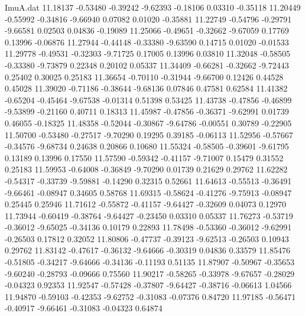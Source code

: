 \begin{filecontents}{ImuA.dat}
  11.18137   -0.53480   -0.39242   -9.62393   -0.18106    0.03310   -0.35118
  11.20449   -0.55992   -0.34816   -9.66940    0.07082    0.01020   -0.35881
  11.22749   -0.54796   -0.29791   -9.66581    0.02503    0.04836   -0.19089
  11.25066   -0.49651   -0.32662   -9.67059    0.17769    0.13996   -0.06876
  11.27944   -0.44148   -0.33380   -9.63590    0.14715    0.01020   -0.01533
  11.29778   -0.49531   -0.32303   -9.71725    0.17005    0.13996    0.03810
  11.32048   -0.58505   -0.33380   -9.73879    0.22348    0.20102    0.05337
  11.34409   -0.66281   -0.32662   -9.72443    0.25402    0.30025    0.25183
  11.36654   -0.70110   -0.31944   -9.66700    0.12426    0.44528    0.45028
  11.39020   -0.71186   -0.38644   -9.68136    0.07846    0.47581    0.62584
  11.41382   -0.65204   -0.45464   -9.67538   -0.01314    0.51398    0.53425
  11.43738   -0.47856   -0.46899   -9.53899   -0.21160    0.40711    0.18313
  11.45987   -0.47856   -0.36371   -9.62991    0.01739    0.46055   -0.18325
  11.48358   -0.52044   -0.30867   -9.64786   -0.00551    0.30789   -0.22905
  11.50700   -0.53480   -0.27517   -9.70290    0.19295    0.39185   -0.06113
  11.52956   -0.57667   -0.34576   -9.68734    0.24638    0.20866    0.10680
  11.55324   -0.58505   -0.39601   -9.61795    0.13189    0.13996    0.17550
  11.57590   -0.59342   -0.41157   -9.71007    0.15479    0.31552    0.25183
  11.59953   -0.64008   -0.36849   -9.70290    0.01739    0.21629    0.29762
  11.62282   -0.54317   -0.33739   -9.59881   -0.14290    0.32315    0.52661
  11.64613   -0.55513   -0.36491   -9.66461   -0.08947    0.34605    0.58768
  11.69315   -0.58624   -0.41276   -9.75913   -0.08947    0.25445    0.25946
  11.71612   -0.55872   -0.41157   -9.64427   -0.32609    0.04073    0.12970
  11.73944   -0.60419   -0.38764   -9.64427   -0.23450    0.03310    0.05337
  11.76273   -0.53719   -0.36012   -9.65025   -0.34136    0.10179    0.22893
  11.78498   -0.53360   -0.36012   -9.62991   -0.26503    0.17812    0.32052
  11.80806   -0.47737   -0.39123   -9.62513   -0.26503    0.10943    0.29762
  11.83142   -0.47617   -0.36132   -9.64666   -0.30319    0.04836    0.33579
  11.85476   -0.51805   -0.34217   -9.64666   -0.34136   -0.11193    0.51135
  11.87907   -0.50967   -0.35653   -9.60240   -0.28793   -0.09666    0.75560
  11.90217   -0.58265   -0.33978   -9.67657   -0.28029   -0.04323    0.92353
  11.92547   -0.57428   -0.37807   -9.64427   -0.38716   -0.06613    1.04566
  11.94870   -0.59103   -0.42353   -9.62752   -0.31083   -0.07376    0.84720
  11.97185   -0.56471   -0.40917   -9.66461   -0.31083   -0.04323    0.64874

\end{filecontents}

